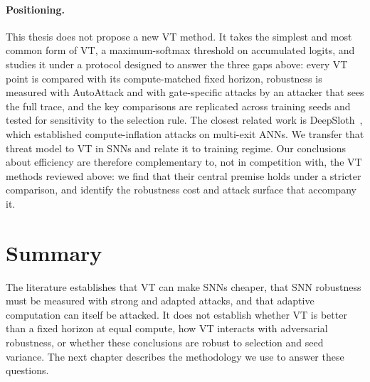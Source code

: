 \paragraph{Positioning.} This thesis does not propose a new VT method. It takes the simplest and most common form of VT, a maximum-softmax threshold on accumulated logits, and studies it under a protocol designed to answer the three gaps above: every VT point is compared with its compute-matched fixed horizon, robustness is measured with AutoAttack and with gate-specific attacks by an attacker that sees the full trace, and the key comparisons are replicated across training seeds and tested for sensitivity to the selection rule. The closest related work is DeepSloth~\cite{hong2021panda}, which established compute-inflation attacks on multi-exit ANNs. We transfer that threat model to VT in SNNs and relate it to training regime. Our conclusions about efficiency are therefore complementary to, not in competition with, the VT methods reviewed above: we find that their central premise holds under a stricter comparison, and identify the robustness cost and attack surface that accompany it.

\section{Summary}

The literature establishes that VT can make SNNs cheaper, that SNN robustness must be measured with strong and adapted attacks, and that adaptive computation can itself be attacked. It does not establish whether VT is better than a fixed horizon at equal compute, how VT interacts with adversarial robustness, or whether these conclusions are robust to selection and seed variance. The next chapter describes the methodology we use to answer these questions.
